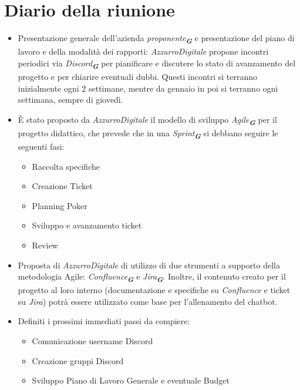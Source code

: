 

\section{Diario della riunione}

\begin{itemize}
    \item Presentazione generale dell'azienda \emph{proponente}\textsubscript{\textit{\textbf{G}}} e presentazione del piano di lavoro e della modalità dei rapporti: 
    \emph{AzzurroDigitale} propone incontri periodici via \emph{Discord}\textsubscript{\textit{\textbf{G}}} per pianificare e discutere lo stato di avanzamento del 
    progetto e per chiarire eventuali dubbi. Questi incontri si terranno inizialmente ogni 2 settimane, mentre da gennaio in poi si terranno ogni settimana, sempre di giovedì.
    \item È stato proposto da \emph{AzzurroDigitale} il modello di sviluppo \emph{Agile}\textsubscript{\textit{\textbf{G}}} per il progetto didattico, che prevede che in una 
    \emph{Sprint}\textsubscript{\textit{\textbf{G}}} si debbano seguire le seguenti fasi:
    \begin{itemize}
        \item Raccolta specifiche
        \item Creazione Ticket
        \item Planning Poker
        \item Sviluppo e avanzamento ticket
        \item Review
    \end{itemize}
    \item Proposta di \emph{AzzurroDigitale} di utilizzo di due strumenti a supporto della metodologia Agile: \emph{Confluence}\textsubscript{\textit{\textbf{G}}} e 
    \emph{Jira}\textsubscript{\textit{\textbf{G}}}. Inoltre, il contenuto creato per il progetto al loro interno (documentazione e specifiche su \emph{Confluence} 
    e ticket su \emph{Jira}) potrà essere utilizzato come base per l’allenamento del chatbot.
    \item Definiti i prossimi immediati passi da compiere:
    \begin{itemize}
        \item Comunicazione username Discord
        \item Creazione gruppi Discord
        \item Sviluppo Piano di Lavoro Generale e eventuale Budget

\end{itemize}
\end{itemize}
